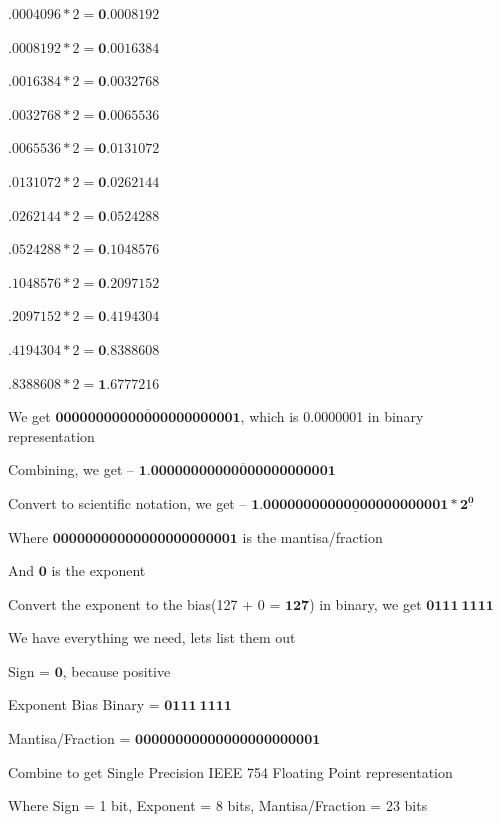 \documentclass{article}
\begin{document}
    $.0004096 * 2 = \mathbf{0}.0008192$

    $.0008192 * 2 = \mathbf{0}.0016384$

    $.0016384 * 2 = \mathbf{0}.0032768$

    $.0032768 * 2 = \mathbf{0}.0065536$

    $.0065536 * 2 = \mathbf{0}.0131072$

    $.0131072 * 2 = \mathbf{0}.0262144$

    $.0262144 * 2 = \mathbf{0}.0524288$

    $.0524288 * 2 = \mathbf{0}.1048576$

    $.1048576 * 2 = \mathbf{0}.2097152$

    $.2097152 * 2 = \mathbf{0}.4194304$

    $.4194304 * 2 = \mathbf{0}.8388608$

    $.8388608 * 2 = \mathbf{1}.6777216$
    
    We get $\mathbf{\overline{00000000000000000000001}}$, which is 0.0000001 in binary representation
    
    \vspace*{0.1in}

    Combining, we get -- $\mathbf{1.\overline{00000000000000000000001}}$

    Convert to scientific notation, we get -- $\mathbf{1.\underline{00000000000000000000001} * 2^{\underline{0}}}$

    Where $\mathbf{00000000000000000000001}$ is the mantisa/fraction

    And $\mathbf{0}$ is the exponent

    Convert the exponent to the bias(127 + 0 = $\mathbf{127}$) in binary, we get $\mathbf{0111\:1111}$

    We have everything we need, lets list them out

    \vspace*{0.1in}

    Sign = $\mathbf{0}$, because positive

    Exponent Bias Binary = $\mathbf{0111\:1111}$

    Mantisa/Fraction = $\mathbf{00000000000000000000001}$

    Combine to get Single Precision IEEE 754 Floating Point representation

    Where Sign = 1 bit, Exponent = 8 bits, Mantisa/Fraction = 23 bits

    \vspace*{0.1in}
\end{document}
